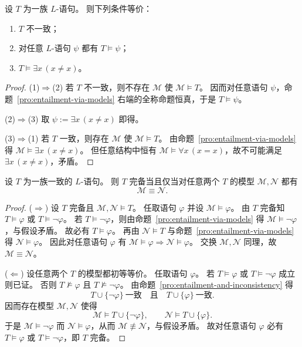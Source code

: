 \documentclass[lang=cn,a4paper,newtx,section]{elegantbook}
\begin{document}
 \begin{proposition}
 \label{inconsistent-theory-characterizations}
 设 $T$ 为一族 $L$-语句。
 则下列条件等价：
 \begin{enumerate}
   \item $T$ 不一致；
   \item 对任意 $L$-语句 $\psi$ 都有 $T\models\psi$；
   \item $T\models\exists x\,(x\neq x)$。
 \end{enumerate}
 \end{proposition}

 \begin{proof}
 (1)$\Rightarrow$(2) 若 $T$ 不一致，则不存在 $\mathcal M$ 使 $\mathcal M\models T$。
 因而对任意语句 $\psi$，命题~\ref{pro:entailment-via-models} 右端的全称命题恒真，于是 $T\models\psi$。

 (2)$\Rightarrow$(3) 取 $\psi:=\exists x\,(x\neq x)$ 即得。

 (3)$\Rightarrow$(1) 若 $T$ 一致，则存在 $\mathcal M$ 使 $\mathcal M\models T$。
 由命题~\ref{pro:entailment-via-models} 得 $\mathcal M\models\exists x\,(x\neq x)$。
 但任意结构中恒有 $\mathcal M\models\forall x\,(x=x)$，故不可能满足 $\exists x\,(x\neq x)$，矛盾。
 \end{proof}

 \begin{theorem}
 \label{complete-theory-characterization-by-models}
 设 $T$ 为一族一致的 $L$-语句。
 则 $T$ 完备当且仅当对任意两个 $T$ 的模型 $\mathcal M,\mathcal N$ 都有
 \[
   \mathcal M\equiv\mathcal N.
 \]
 \end{theorem}

 \begin{proof}
 ($\Rightarrow$) 设 $T$ 完备且 $\mathcal M,\mathcal N\models T$。
 任取语句 $\varphi$ 并设 $\mathcal M\models\varphi$。
 由 $T$ 完备知 $T\models\varphi$ 或 $T\models\neg\varphi$。
 若 $T\models\neg\varphi$，则由命题~\ref{pro:entailment-via-models} 得 $\mathcal M\models\neg\varphi$，与假设矛盾。
 故必有 $T\models\varphi$。
 再由 $\mathcal N\models T$ 与命题~\ref{pro:entailment-via-models} 得 $\mathcal N\models\varphi$。
 因此对任意语句 $\varphi$ 有 $\mathcal M\models\varphi\Rightarrow\mathcal N\models\varphi$。
 交换 $\mathcal M,\mathcal N$ 同理，故 $\mathcal M\equiv\mathcal N$。

 ($\Leftarrow$) 设任意两个 $T$ 的模型都初等等价。
 任取语句 $\varphi$。
 若 $T\models\varphi$ 或 $T\models\neg\varphi$ 成立则已证。
 否则 $T\not\models\varphi$ 且 $T\not\models\neg\varphi$。
 由命题~\ref{pro:entailment-and-inconsistency} 得
 \[
   T\cup\{\neg\varphi\}\ \text{一致}\quad\text{且}\quad T\cup\{\varphi\}\ \text{一致}.
 \]
 因而存在模型 $\mathcal M,\mathcal N$ 使得
 \[
   \mathcal M\models T\cup\{\neg\varphi\},\qquad \mathcal N\models T\cup\{\varphi\}.
 \]
 于是 $\mathcal M\models\neg\varphi$ 而 $\mathcal N\models\varphi$，从而 $\mathcal M\not\equiv\mathcal N$，与假设矛盾。
 故对任意语句 $\varphi$ 必有 $T\models\varphi$ 或 $T\models\neg\varphi$，即 $T$ 完备。
 \end{proof}
\end{document}
